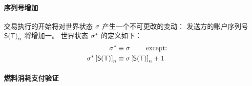 \paragraph{序列号增加}
交易执行的开始将对世界状态 $\st$ 产生一个不可更改的变动：
发送方的账户序列号 $\sender{\tx}_n$ 将增加一。
%
世界状态 $\st^*$ 的定义如下：
\begin{align}
	\st^*  &\eqdef \st \qquad \mbox{  except:}\\
	\st^*\left[\sender{\tx} \right]_n &\eqdef \st\left[\sender{\tx} \right]_n+1 
\end{align}

\paragraph{燃料消耗支付验证}

